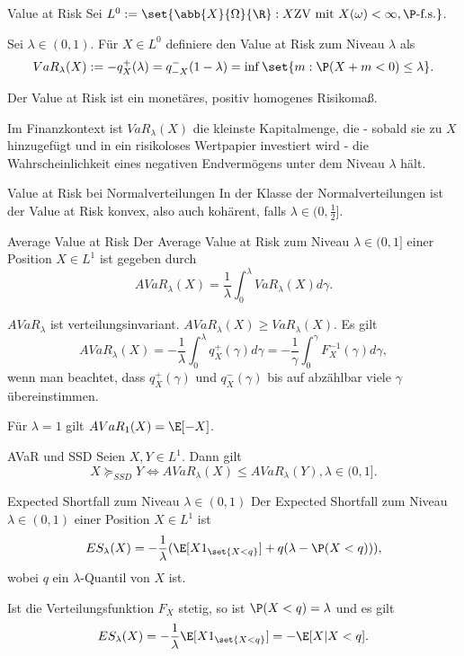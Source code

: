 \begin{karte}{Value at Risk}
Sei \(L^0 := \set{\abb{X}{\Omega}{\R}: X \text{ZV mit } X(\omega) < \infty, \P\text{-f.s.}} \).

Sei \(\lambda \in (0,1)\). Für \(X \in L^0\) definiere den Value at Risk zum Niveau \(\lambda\) als 
\[ VaR_\lambda(X) := -q_X^+(\lambda) = q_{-X}^-(1-\lambda) = \inf\set{m: \P(X+m < 0) \leq \lambda}. \]

Der Value at Risk ist ein monetäres, positiv homogenes Risikomaß.

Im Finanzkontext ist \(VaR_\lambda(X)\) die kleinste Kapitalmenge, die - sobald sie zu \(X\)
hinzugefügt und in ein risikoloses Wertpapier investiert wird - die Wahrscheinlichkeit 
eines negativen Endvermögens unter dem Niveau \(\lambda\) hält. 
\end{karte}

\begin{karte}{Value at Risk bei Normalverteilungen}
In der Klasse der Normalverteilungen ist der Value at Risk konvex, also auch kohärent, falls 
\(\lambda \in (0,\frac{1}{2}]\).
\end{karte}

\begin{karte}{Average Value at Risk}
Der Average Value at Risk zum Niveau \(\lambda \in (0,1]\) einer Position \(X\in L^1\) ist gegeben durch 
\[ AVaR_\lambda(X) = \frac{1}{\lambda} \int_0^\lambda VaR_\lambda(X) d\gamma. \]

\(AVaR_\lambda\) ist verteilungsinvariant. \(AVaR_\lambda(X) \geq VaR_\lambda(X)\).
Es gilt 
\[ AVaR_\lambda(X) = -\frac{1}{\lambda}\int_0^\lambda q_X^+(\gamma) d\gamma 
= - \frac{1}{\gamma} \int_0^\gamma F_X^{-1}(\gamma) d\gamma, \]
wenn man beachtet, dass \(q_X^+(\gamma)\) und \(q_X^-(\gamma)\) bis auf abzählbar viele
\(\gamma\) übereinstimmen. 

Für \(\lambda=1\) gilt \(AVaR_1(X) = \E[-X]\).
\end{karte}

\begin{karte}{AVaR und SSD}
Seien \(X,Y\in L^1\). Dann gilt 
\[ X \succeq_{SSD} Y \Leftrightarrow AVaR_\lambda(X) \leq AVaR_\lambda(Y), \lambda \in (0,1]. \]
\end{karte}

\begin{karte}{Expected Shortfall zum Niveau \(\lambda \in (0,1)\)}
Der Expected Shortfall zum Niveau \(\lambda \in (0,1)\) einer Position \(X \in L^1\) ist 
\[ E S_\lambda(X) = -\frac{1}{\lambda} (\E[X 1_{\set{X<q}}] + q(\lambda - \P(X<q))), \]
wobei \(q\) ein \(\lambda\)-Quantil von \(X\) ist.

Ist die Verteilungsfunktion \(F_X\) stetig, so ist \(\P(X<q) = \lambda\) und es gilt 
\[ E S_\lambda(X) = -\frac{1}{\lambda} \E[X 1_{\set{X < q}}] = -\E[X | X < q]. \]
\end{karte}

